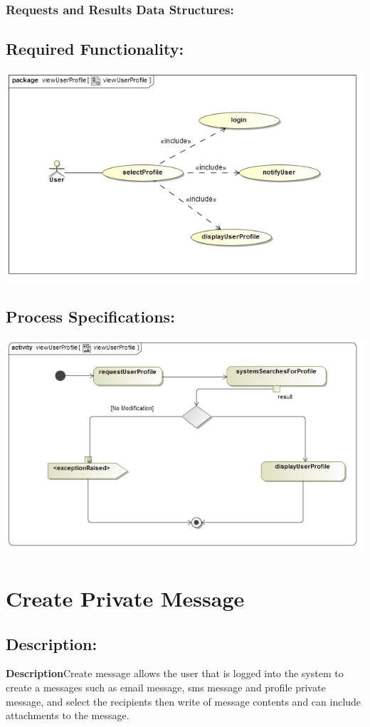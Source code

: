 \documentclass[a4paper,11pt]{article}
\begin{document}
\subsubsection*{Requests and Results Data Structures:}
\subsection{Required Functionality:} 
\includegraphics[width=1\linewidth]{./Images/UserProfile/ViewUserProfileUseCase}
\subsection{Process Specifications:} 
\includegraphics[width=1\linewidth]{./Images/UserProfile/ViewUserProfileActivity}

\section{Create Private Message}
\subsection*{Description:}
\textbf{Description}Create message allows the user that is logged into the system to create a messages such as email message, sms message and profile private message, and select the recipients then write of message contents and can include attachments to the message. 
\end{document}
